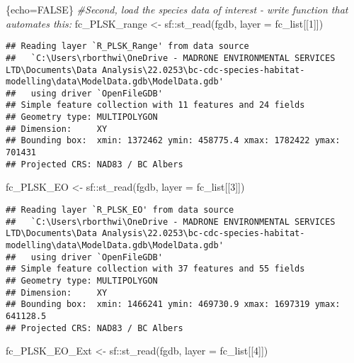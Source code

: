 \documentclass[
]{article}
\newenvironment{Shaded}{\begin{snugshade}}{\end{snugshade}}
\newcommand{\AttributeTok}[1]{\textcolor[rgb]{0.77,0.63,0.00}{#1}}
\newcommand{\CommentTok}[1]{\textcolor[rgb]{0.56,0.35,0.01}{\textit{#1}}}
\newcommand{\ConstantTok}[1]{\textcolor[rgb]{0.00,0.00,0.00}{#1}}
\newcommand{\DecValTok}[1]{\textcolor[rgb]{0.00,0.00,0.81}{#1}}
\newcommand{\FunctionTok}[1]{\textcolor[rgb]{0.00,0.00,0.00}{#1}}
\newcommand{\NormalTok}[1]{#1}
\newcommand{\OtherTok}[1]{\textcolor[rgb]{0.56,0.35,0.01}{#1}}
\newcommand{\SpecialCharTok}[1]{\textcolor[rgb]{0.00,0.00,0.00}{#1}}
\begin{document}
\begin{Shaded}
\begin{Highlighting}[]
\NormalTok{\{echo}\OtherTok{=}\ConstantTok{FALSE}\NormalTok{\}}
\CommentTok{\#Second, load the species data of interest {-} write function that automates this:}
\NormalTok{fc\_PLSK\_range }\OtherTok{\textless{}{-}}\NormalTok{ sf}\SpecialCharTok{::}\FunctionTok{st\_read}\NormalTok{(fgdb, }\AttributeTok{layer =}\NormalTok{ fc\_list[[}\DecValTok{1}\NormalTok{]])}
\end{Highlighting}
\end{Shaded}

\begin{verbatim}
## Reading layer `R_PLSK_Range' from data source 
##   `C:\Users\rborthwi\OneDrive - MADRONE ENVIRONMENTAL SERVICES LTD\Documents\Data Analysis\22.0253\bc-cdc-species-habitat-modelling\data\ModelData.gdb\ModelData.gdb' 
##   using driver `OpenFileGDB'
## Simple feature collection with 11 features and 24 fields
## Geometry type: MULTIPOLYGON
## Dimension:     XY
## Bounding box:  xmin: 1372462 ymin: 458775.4 xmax: 1782422 ymax: 701431
## Projected CRS: NAD83 / BC Albers
\end{verbatim}

\begin{Shaded}
\begin{Highlighting}[]
\NormalTok{fc\_PLSK\_EO }\OtherTok{\textless{}{-}}\NormalTok{ sf}\SpecialCharTok{::}\FunctionTok{st\_read}\NormalTok{(fgdb, }\AttributeTok{layer =}\NormalTok{ fc\_list[[}\DecValTok{3}\NormalTok{]])}
\end{Highlighting}
\end{Shaded}

\begin{verbatim}
## Reading layer `R_PLSK_EO' from data source 
##   `C:\Users\rborthwi\OneDrive - MADRONE ENVIRONMENTAL SERVICES LTD\Documents\Data Analysis\22.0253\bc-cdc-species-habitat-modelling\data\ModelData.gdb\ModelData.gdb' 
##   using driver `OpenFileGDB'
## Simple feature collection with 37 features and 55 fields
## Geometry type: MULTIPOLYGON
## Dimension:     XY
## Bounding box:  xmin: 1466241 ymin: 469730.9 xmax: 1697319 ymax: 641128.5
## Projected CRS: NAD83 / BC Albers
\end{verbatim}

\begin{Shaded}
\begin{Highlighting}[]
\NormalTok{fc\_PLSK\_EO\_Ext }\OtherTok{\textless{}{-}}\NormalTok{ sf}\SpecialCharTok{::}\FunctionTok{st\_read}\NormalTok{(fgdb, }\AttributeTok{layer =}\NormalTok{ fc\_list[[}\DecValTok{4}\NormalTok{]])}
\end{Highlighting}
\end{Shaded}
\end{document}

